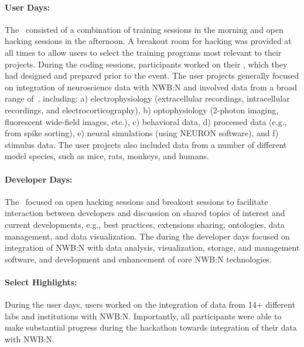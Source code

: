 \documentclass{article}
\begin{document}
\paragraph{User Days:} The~ consisted of a combination of training sessions in the morning and open hacking sessions in the afternoon. A breakout room for hacking was provided at all times to allow users to select the training programs most relevant to their projects. During the coding sessions, participants worked on their , which they had designed and prepared prior to the event. The user projects generally focused on integration of neuroscience data with NWB:N and involved data from a broad range of~, including: a) electrophysiology (extracellular recordings, intracellular recordings, and electrocorticography), b) optophysiology (2-photon imaging, fluorescent wide-field images, etc.), c) behavioral data, d) processed data (e.g., from spike sorting), e) neural simulations (using NEURON software), and f) stimulus data. The user projects also included data from a number of different model species, such as mice, rats, monkeys, and humans. %

\vspace{-0.2cm}
\paragraph{Developer Days:} The~ focused on open hacking sessions and breakout sessions to facilitate interaction between developers and discussion on shared topics of interest and current developments, e.g., best practices, extensions sharing, ontologies, data management, and data visualization. The  during the developer days focused on integration of NWB:N with data analysis, visualization, storage, and management software, and development and enhancement of core NWB:N technologies. 

\vspace{-0.2cm}
\paragraph{Select Highlights:} During the user days, users worked on the integration of data from 14+ different labs and institutions with NWB:N. Importantly, all participants were able to make substantial progress during the hackathon towards integration of their data with NWB:N.
\end{document}
